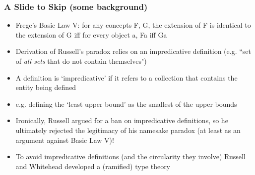 \begin{frame}
\frametitle{A Slide to Skip (some background)}


\begin{itemize}%

\item Frege's Basic Law V: for any concepts F, G, the extension of F is identical to the extension of G iff for every object a, Fa iff Ga

\item Derivation of Russell's paradox relies on an impredicative definition (e.g. ``set of \textit{all sets} that do not contain themselves")

\item A definition is `impredicative' if it refers to a collection that contains the entity being defined

\item[] e.g. defining the `least upper bound' as the smallest of the upper bounds

\item Ironically, Russell argued for a ban on impredicative definitions, so he ultimately rejected the legitimacy of his namesake paradox (at least as an argument against Basic Law V)!

\item To avoid impredicative definitions (and the circularity they involve) Russell and Whitehead developed a (ramified) type theory 


\end{itemize}
\end{frame}

